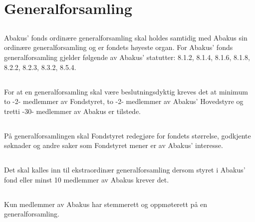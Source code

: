 \section{Generalforsamling}

\subsection{}
Abakus’ fonds ordinære generalforsamling skal holdes samtidig med Abakus sin
ordinære generalforsamling og er fondets høyeste organ. For Abakus’ fonds
generalforsamling gjelder følgende av Abakus’ statutter: 8.1.2, 8.1.4, 8.1.6,
8.1.8, 8.2.2, 8.2.3, 8.3.2, 8.5.4.

\subsection{}
For at en generalforsamling skal være beslutningsdyktig kreves det at minimum
to -2- medlemmer av Fondstyret, to -2- medlemmer av Abakus’ Hovedstyre og tretti
-30- medlemmer av Abakus er tilstede.

\subsection{}
På generalforsamlingen skal Fondstyret redegjøre for fondets størrelse,
godkjente søknader og andre saker som Fondstyret mener er av Abakus’
interesse.

\subsection{}
Det skal kalles inn til ekstraordinær generalforsamling dersom styret i
Abakus’ fond eller minst 10 medlemmer av Abakus krever det.

\subsection{}
Kun medlemmer av Abakus har stemmerett og oppmøterett på en generalforsamling.
